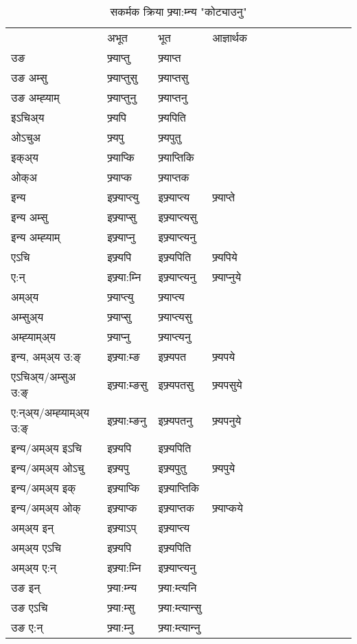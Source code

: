 \begin{table}[H]
\label{ɛpt.vt} \centering
\caption{सकर्मक क्रिया  फ्र्या:म्‍न्य  "कोट्याउनु"  }
\begin{tabular}{l|l|l|l|l|l|l|l|l|l|l|l|l}  \toprule
&अभूत & भूत & आज्ञार्थक \\ 
उङ &फ्र्याप्‍तु &फ्र्याप्‍त \\ 
उङ अम्सु&फ्र्याप्‍तुसु &फ्र्याप्‍तसु \\ 
उङ अम्ह्‍याम्&फ्र्याप्‍तुनु &फ्र्याप्‍तनु \\ 
इऽचिअ्य &फ्र्यपि &फ्र्यपिति   \\ 
ओऽचुअ        &फ्र्यपु &फ्र्यपुतु   \\ 
इक्अ्य&फ्र्याप्कि &फ्र्याप्‍तिकि   \\ 
ओक्अ &फ्र्याप्क &फ्र्याप्‍तक   \\ 
इन्य & इफ्र्याप्‍त्यु  & इफ्र्याप्‍त्य &फ्र्याप्‍ते  \\ 
इन्य अम्सु& इफ्र्याप्सु  & इफ्र्याप्‍त्यसु   \\ 
इन्य अम्ह्‍याम्& इफ्र्याप्‍नु  & इफ्र्याप्‍त्यनु   \\ 
एऽचि & इफ्र्यपि & इफ्र्यपिति &फ्र्यपिये    \\ 
ए:न् & इफ्र्या:म्‍नि  & इफ्र्याप्‍त्यनु &फ्र्याप्‍नुये  \\ 
अम्अ्य & फ्र्याप्‍त्यु  & फ्र्याप्‍त्य  \\ 
अम्सुअ्य & फ्र्याप्सु & फ्र्याप्‍त्यसु  \\ 
अम्ह्‍याम्अ्य & फ्र्याप्‍नु  & फ्र्याप्‍त्यनु \\ 
\midrule
इन्य, अम्अ्य उ:ङ्‌ &इफ्र्या:म्ङ &इफ्र्यपत &फ्र्यपये \\ 
एऽचिअ्य/अम्सुअ उ:ङ्‌ &इफ्र्या:म्ङसु &इफ्र्यपतसु &फ्र्यपसुये \\ 
ए:न्अ्य/अम्ह्‍याम्अ्य उ:ङ्‌ &इफ्र्या:म्ङनु &इफ्र्यपतनु &फ्र्यपनुये \\ 
इन्य/अम्अ्य इऽचि &इफ्र्यपि &इफ्र्यपिति    \\ 
इन्य/अम्अ्य ओऽचु &इफ्र्यपु &इफ्र्यपुतु  &फ्र्यपुये  \\ 
इन्य/अम्अ्य इक् &इफ्र्याप्कि &इफ्र्याप्‍तिकि   \\ 
इन्य/अम्अ्य ओक् &इफ्र्याप्क &इफ्र्याप्‍तक  &फ्र्याप्कये  \\ 
अम्अ्य इन् & इफ्र्याऽप् & इफ्र्याप्‍त्य   \\ 
अम्अ्य एऽचि & इफ्र्यपि & इफ्र्यपिति    \\ 
अम्अ्य ए:न् & इफ्र्या:म्‍नि  & इफ्र्याप्‍त्यनु  \\ 
\midrule
उङ इन् & फ्र्या:म्‍न्य  & फ्र्या:म्त्यनि  \\ 
उङ एऽचि & फ्र्या:म्सु  & फ्र्या:म्त्यान्सु   \\ 
उङ ए:न्& फ्र्या:म्‍नु  & फ्र्या:म्त्यान्‍नु   \\ 
\bottomrule
\end{tabular}
\end{table}



